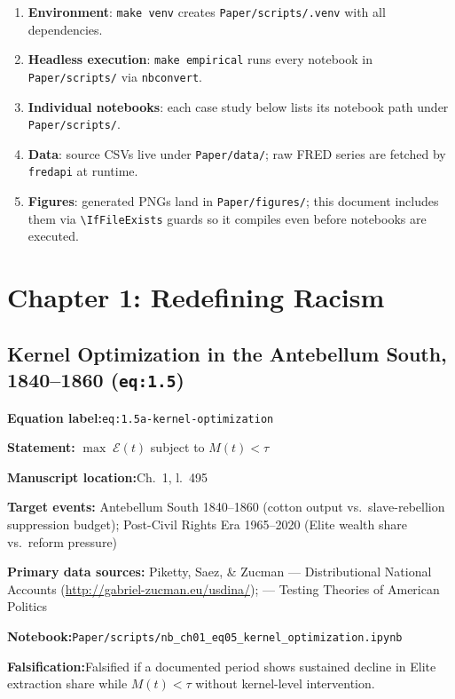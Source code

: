 \documentclass[12pt]{article}
\newcommand{\TierOne}{\textcolor{green!60!black}{\textbf{T1}}}
\newcommand{\caserow}[2]{%
  \noindent\textbf{#1:}\enspace #2\par\smallskip}
\begin{document}
\begin{enumerate}
  \item \textbf{Environment}: \texttt{make venv} creates
    \texttt{Paper/scripts/.venv} with all dependencies.
  \item \textbf{Headless execution}: \texttt{make empirical} runs every
    notebook in \texttt{Paper/scripts/} via \texttt{nbconvert}.
  \item \textbf{Individual notebooks}: each case study below lists its
    notebook path under \texttt{Paper/scripts/}.
  \item \textbf{Data}: source CSVs live under \texttt{Paper/data/};
    raw FRED series are fetched by \texttt{fredapi} at runtime.
  \item \textbf{Figures}: generated PNGs land in \texttt{Paper/figures/};
    this document includes them via \verb|\IfFileExists| guards so it
    compiles even before notebooks are executed.
\end{enumerate}

\section{Chapter 1: Redefining Racism}

\subsection{Kernel Optimization in the Antebellum South, 1840--1860
  (\texttt{eq:1.5})}

\begin{tcolorbox}[caseblock, title={%
  \TierOne\quad Kernel Optimization in the Antebellum South, 1840--1860}]

\caserow{Equation label}{\texttt{eq:1.5a-kernel-optimization}}
\caserow{Statement}{%
  $\max\; \mathcal{E}(t)$ \quad subject to \quad $M(t) < \tau$}
\caserow{Manuscript location}{Ch.~1, l.~495}
\caserow{Target events}{%
  Antebellum South 1840--1860 (cotton output vs.\ slave-rebellion
  suppression budget); Post-Civil Rights Era 1965--2020 (Elite wealth
  share vs.\ reform pressure)}
\caserow{Primary data sources}{%
  Piketty, Saez, \& Zucman --- Distributional National Accounts
  (\url{http://gabriel-zucman.eu/usdina/});
  \textcite{gilens} --- Testing Theories of American Politics}
\caserow{Notebook}{\texttt{Paper/scripts/nb\_ch01\_eq05\_kernel\_optimization.ipynb}}
\caserow{Falsification}{Falsified if a documented period shows sustained
  decline in Elite extraction share while $M(t)<\tau$ without
  kernel-level intervention.}

\end{tcolorbox}
\end{document}
